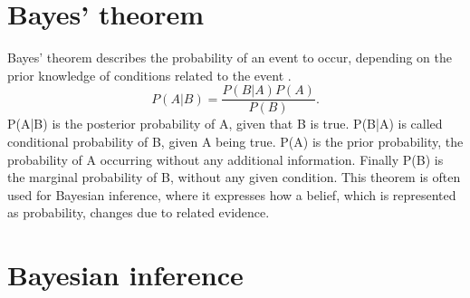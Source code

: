 \section{Bayes' theorem}

Bayes' theorem describes the probability of an event to occur, depending on the prior knowledge of conditions related to the event \citep{bayesBasic}. 
\begin{equation}
\label{eqn:bayesianTheorem}
P(A|B) = \frac{P(B|A)P(A)}{P(B)}.
\end{equation}
P(A|B) is the posterior probability of A, given that B is true. P(B|A) is called conditional probability of B, given A being true. P(A) is the prior probability, the probability of A occurring without any additional information. Finally P(B) is the marginal probability of B, without any given condition. This theorem is often used for Bayesian inference, where it expresses how a belief, which is represented as probability, changes due to related evidence.	

\section{Bayesian inference}
\label{section:bayesianInference}

